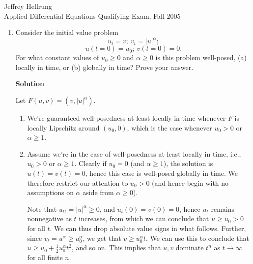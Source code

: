 \documentclass{article}
\begin{document}
\begin{flushright}
Jeffrey Hellrung \\
Applied Differential Equations Qualifying Exam, Fall 2005 \\
\end{flushright}


\begin{enumerate}

\item Consider the initial value problem
\[u_t = v; \ v_t = |u|^{\alpha};\]
\[u(t = 0) = u_0; \ v(t = 0) = 0.\]
For what constant values of \(u_0 \geq 0\) and \(\alpha \geq 0\) is this problem well-posed, (a) locally in time, or (b) globally in time?  Prove your answer.

{\bf Solution}

Let \(F(u,v) = (v, |u|^{\alpha})\).

\begin{enumerate}
\item We're guaranteed well-posedness at least locally in time whenever \(F\) is locally Lipschitz around \((u_0,0)\), which is the case whenever \(u_0 > 0\) or \(\alpha \geq 1\).

\item Assume we're in the case of well-posedness at least locally in time, i.e., \(u_0 > 0\) or \(\alpha \geq 1\).  Clearly if \(u_0 = 0\) (and \(\alpha \geq 1\)), the solution is \(u(t) = v(t) = 0\), hence this case is well-posed globally in time.  We therefore restrict our attention to \(u_0 > 0\) (and hence begin with no assumptions on \(\alpha\) aside from \(\alpha \geq 0\)).

Note that \(u_{tt} = |u|^{\alpha} \geq 0\), and \(u_t(0) = v(0) = 0\), hence \(u_t\) remains nonnegative as \(t\) increases, from which we can conclude that \(u \geq u_0 > 0\) for all \(t\).  We can thus drop absolute value signs in what follows.  Further, since \(v_t = u^{\alpha} \geq u_0^{\alpha}\), we get that \(v \geq u_0^{\alpha} t\).  We can use this to conclude that \(u \geq u_0 + \frac{1}{2} u_0^{\alpha} t^2\), and so on.  This implies that \(u,v\) dominate \(t^n\) as \(t \to \infty\) for all finite \(n\).


\end{enumerate}
\end{enumerate}
\end{document}

